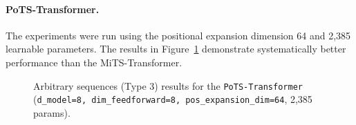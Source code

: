 \documentclass[final]{article}
\begin{document}
\paragraph{PoTS-Transformer.} The experiments were run using the positional expansion dimension 64 and 2,385 learnable parameters. The results in Figure~\ref{fig:type3_PoTS32} demonstrate systematically better performance than the MiTS-Transformer.

\begin{figure}[h]
  \caption{Arbitrary sequences (Type 3) results for the \texttt{PoTS-Transformer} (\texttt{d\_model=8, dim\_feedforward=8, pos\_expansion\_dim=64}, 2,385 params).\label{fig:type3_PoTS32}}
\end{figure}


\end{document}
